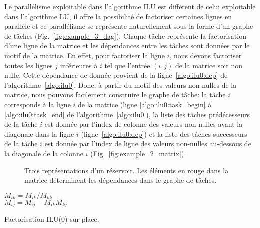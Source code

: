 Le parallélisme exploitable dans l'algorithme ILU est différent de celui exploitable dans l'algorithme LU, il offre la possibilité de factoriser certaines lignes en parallèle et ce parallélisme se représente naturellement sous la forme d'un graphe de tâches (Fig.~\ref{fig:example_3_dag}).
%
Chaque tâche représente la factorisation d'une ligne de la matrice et les dépendances entre les tâches sont données par le motif de la matrice.
%
En effet, pour factoriser la ligne $i$, nous devons factoriser toutes les lignes $j$ inférieures à $i$ tel que l'entrée $(i,j)$ de la matrice soit non nulle.
%
Cette dépendance de donnée provient de la ligne~\ref{algo:ilu0:dep} de l'algorithme~\ref{algo:ilu0}.
%
Donc, à partir du motif des valeurs non-nulles de la matrice, nous pouvons facilement construire le graphe de tâche:
%
la tâche $i$ corresponds à la ligne $i$ de la matrice (ligne \ref{algo:ilu0:task_begin} à \ref{algo:ilu0:task_end} de l'algorithme~\ref{algo:ilu0}), la liste des tâches prédécesseurs de la tâche $i$ est donnée par l'index de colonne des valeurs non-nulles avant la diagonale dans la ligne $i$ (ligne~\ref{algo:ilu0:dep}) et la liste des tâches successeurs de la tâche $i$ est donnée par l'index de ligne des valeurs non-nulles au-dessous de la diagonale de la colonne $i$ (Fig.~\ref{fig:example_2_matrix}).

\begin{figure}[!ht]
     \begin{center}
    \end{center}
    \caption{Trois représentations d'un réservoir. Les éléments en rouge dans la matrice déterminent les dépendances dans le graphe de tâches.}
    \label{fig:exemple_3_dag}
\end{figure}

\begin{algorithm}
   {
     { \label{algo:ilu0:task_begin}
      $M_{ik} = M_{ik} / M_{kk}$ \label{algo:ilu0:dep}\\
       {
        $M_{ij} = M_{ij} - M_{ik}M_{kj}$ \\
      }
    } \label{algo:ilu0:task_end}
  }
  \caption{Factorisation ILU(0) sur place.}
  \label{algo:ilu0}
\end{algorithm}


